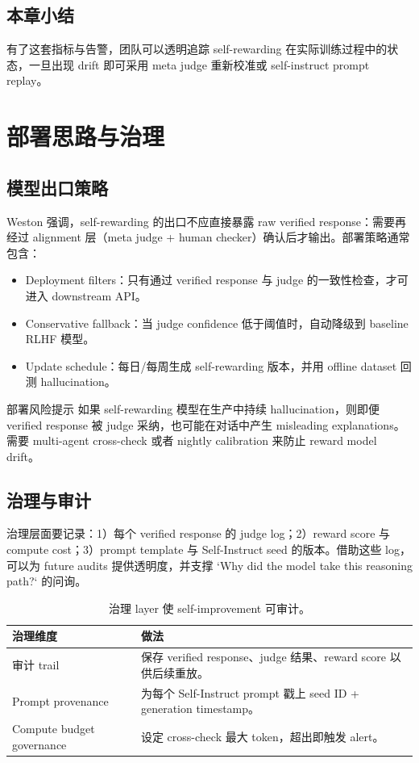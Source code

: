 \documentclass[a4paper]{article}
\begin{document}
\subsection{本章小结}
有了这套指标与告警，团队可以透明追踪 self-rewarding 在实际训练过程中的状态，一旦出现 drift 即可采用 meta judge 重新校准或 self-instruct prompt replay。

\section{部署思路与治理}
\subsection{模型出口策略}
Weston 强调，self-rewarding 的出口不应直接暴露 raw verified response：需要再经过 alignment 层（meta judge + human checker）确认后才输出。部署策略通常包含：
\begin{itemize}
    \item Deployment filters：只有通过 verified response 与 judge 的一致性检查，才可进入 downstream API。
    \item Conservative fallback：当 judge confidence 低于阈值时，自动降级到 baseline RLHF 模型。
    \item Update schedule：每日/每周生成 self-rewarding 版本，并用 offline dataset 回测 hallucination。
\end{itemize}

\begin{warningbox}{部署风险提示}
如果 self-rewarding 模型在生产中持续 hallucination，则即便 verified response 被 judge 采纳，也可能在对话中产生 misleading explanations。需要 multi-agent cross-check 或者 nightly calibration 来防止 reward model drift。
\end{warningbox}

\subsection{治理与审计}
治理层面要记录：1）每个 verified response 的 judge log；2）reward score 与 compute cost；3）prompt template 与 Self-Instruct seed 的版本。借助这些 log，可以为 future audits 提供透明度，并支撑 `Why did the model take this reasoning path?` 的问询。

\begin{table}[H]
\centering
\begin{tabular}{p{5cm}p{10cm}}
\toprule
治理维度 & 做法 \\
\midrule
审计 trail & 保存 verified response、judge 结果、reward score 以供后续重放。 \\
Prompt provenance & 为每个 Self-Instruct prompt 戳上 seed ID + generation timestamp。 \\
Compute budget governance & 设定 cross-check 最大 token，超出即触发 alert。 \\
\bottomrule
\end{tabular}
\caption{治理 layer 使 self-improvement 可审计。}
\end{table}
\end{document}
